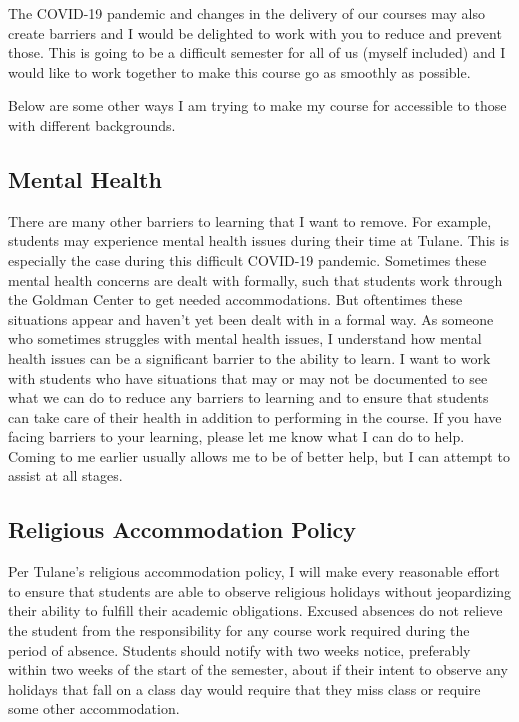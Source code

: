 \documentclass[11pt,letterpaper,final]{article}
\begin{document}
The COVID-19 pandemic and changes in the delivery of our courses may also create barriers and I would be delighted to work with you to reduce and prevent those. This is going to be a difficult semester for all of us (myself included) and I would like to work together to make this course go as smoothly as possible.

Below are some other ways I am trying to make my course for accessible to those with different backgrounds.

\subsection{Mental Health} There are many other barriers to learning that I want to remove. For example, students may experience mental health issues during their time at Tulane. This is especially the case during this difficult COVID-19 pandemic. Sometimes these mental health concerns are dealt with formally, such that students work through the Goldman Center to get needed accommodations. But oftentimes these situations appear and haven't yet been dealt with in a formal way. As someone who sometimes struggles with mental health issues, I understand how mental health issues can be a significant barrier to the ability to learn. I want to work with students who have situations that may or may not be documented to see what we can do to reduce any barriers to learning and to ensure that students can take care of their health in addition to performing in the course. If you have facing barriers to your learning, please let me know what I can do to help. Coming to me earlier usually allows me to be of better help, but I can attempt to assist at all stages.

\subsection{Religious Accommodation Policy}
Per Tulane’s religious accommodation policy, I will make every reasonable effort to ensure that students are able to observe religious holidays without jeopardizing their ability to fulfill their academic obligations. Excused absences do not relieve the student from the responsibility for any course work required during the period of absence. Students should notify with two weeks notice, preferably within two weeks of the start of the semester, about if their intent to observe any holidays that fall on a class day would require that they miss class or require some other accommodation.
\end{document}
